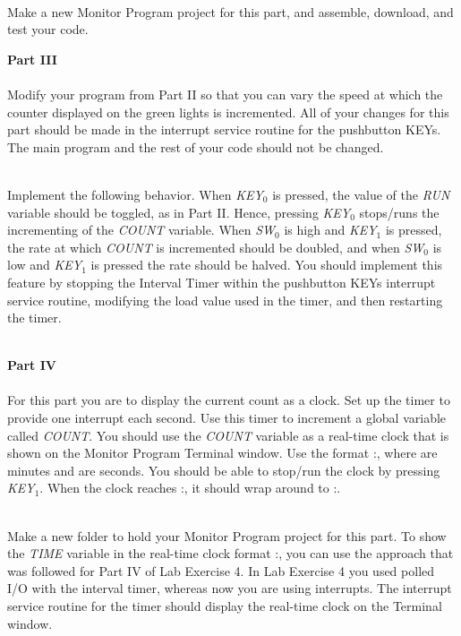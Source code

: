\documentclass[epsfig,10pt,fullpage]{article}
\begin{document}
~\\
\noindent
Make a new Monitor Program project for this part, and assemble, download, and test your
code.


\begin{center}

\end{center}


\noindent
{\bf Part III}
~\\
~\\
\noindent
Modify your program from Part II so that you can vary the speed at which the counter
displayed on the green lights is incremented. All of your changes for this part should be made
in the interrupt service routine for the pushbutton KEYs. The main program and the rest of
your code should not be changed.

~\\
\noindent
Implement the following behavior. When {\it KEY}$_0$ is pressed, the value of the {\it RUN}
variable should be toggled, as in Part II. Hence, pressing {\it KEY}$_0$ stops/runs
the incrementing of the {\it COUNT} variable.
When {\it SW}$_0$ is high and {\it KEY}$_1$ is pressed, 
the rate at which {\it COUNT} is incremented should be doubled, and when {\it SW}$_0$ is 
low and {\it KEY}$_1$ is pressed the rate should be halved. You should implement this feature 
by stopping the Interval Timer within the pushbutton KEYs interrupt service routine, modifying the load value used in the
timer, and then restarting the timer.

~\\
\noindent
\noindent
{\bf Part IV}
~\\
~\\
\noindent
For this part you are to display the current count as a clock.
Set up the timer to provide one interrupt each second. Use this
timer to increment a global variable called {\it COUNT}. You should use the {\it COUNT} variable as
a real-time clock that is shown on the Monitor Program Terminal window. Use the format 
:, where  are minutes and  are seconds.
You should be able to stop/run the clock by pressing {\it KEY}$_1$.
When the clock reaches :, it should wrap around to :.

~\\
\noindent
Make a new folder to hold your Monitor Program project for this part. To show the {\it TIME} variable in
the real-time clock format :, you can use the approach that was
followed for Part IV of Lab Exercise 4. In Lab Exercise 4 you used polled I/O with
the interval timer, whereas now you are using interrupts. The interrupt service routine for
the timer should display the real-time clock on the Terminal window.
\end{document}
